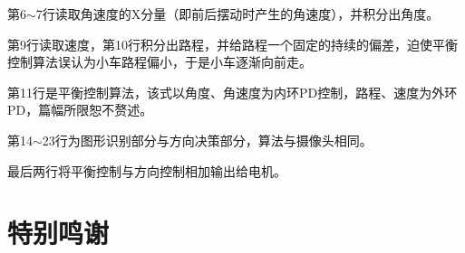 \documentclass[titlepage,a4paper]{ctexart}
\begin{document}
第6$\sim$7行读取角速度的X分量（即前后摆动时产生的角速度），并积分出角度。

第9行读取速度，第10行积分出路程，并给路程一个固定的持续的偏差，迫使平衡控制算法误认为小车路程偏小，于是小车逐渐向前走。

第11行是平衡控制算法，该式以角度、角速度为内环PD控制，路程、速度为外环PD，篇幅所限恕不赘述。

第14$\sim$23行为图形识别部分与方向决策部分，算法与摄像头相同。

最后两行将平衡控制与方向控制相加输出给电机。

\newpage
\section{特别鸣谢}
\begin{figure}[!h]
\centering
\setcounter{subfigure}{0}
 \\
 \\
\end{figure}
\newpage
\end{document}
